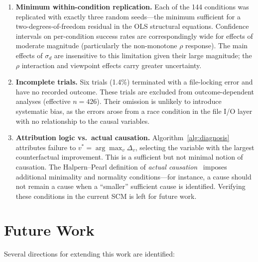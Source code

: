 \documentclass[11pt,a4paper]{report}
\begin{document}
\begin{enumerate}
  \item \textbf{Minimum within-condition replication.} Each of the 144 conditions was replicated with exactly three random seeds---the minimum sufficient for a two-degrees-of-freedom residual in the OLS structural equations. Confidence intervals on per-condition success rates are correspondingly wide for effects of moderate magnitude (particularly the non-monotone $\rho$ response). The main effects of $\sigma_d$ are insensitive to this limitation given their large magnitude; the $\rho$ interaction and viewpoint effects carry greater uncertainty.

  \item \textbf{Incomplete trials.} Six trials (1.4\%) terminated with a file-locking error and have no recorded outcome. These trials are excluded from outcome-dependent analyses (effective $n = 426$). Their omission is unlikely to introduce systematic bias, as the errors arose from a race condition in the file I/O layer with no relationship to the causal variables.

  \item \textbf{Attribution logic vs.\ actual causation.} Algorithm~\ref{alg:diagnosis} attributes failure to $v^* = \arg\max_v \Delta_v$, selecting the variable with the largest counterfactual improvement. This is a sufficient but not minimal notion of causation. The Halpern--Pearl definition of \emph{actual causation}~\cite{halpern2005causes} imposes additional minimality and normality conditions---for instance, a cause should not remain a cause when a ``smaller'' sufficient cause is identified. Verifying these conditions in the current SCM is left for future work.
\end{enumerate}

\section{Future Work}
\label{sec:future_work}

Several directions for extending this work are identified:
\end{document}

